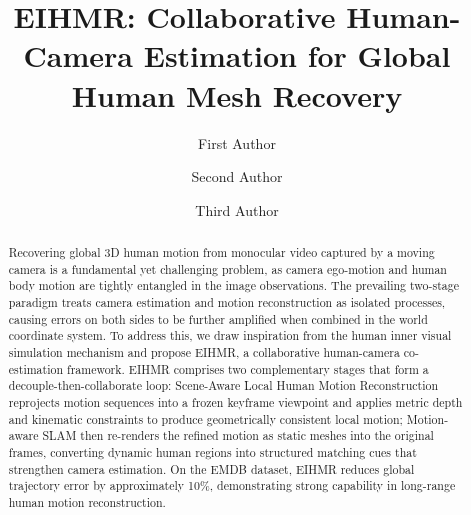 \documentclass[runningheads]{llncs}
\begin{document}
\title{EIHMR: Collaborative Human-Camera Estimation for Global Human Mesh Recovery}


\author{First Author \and
Second Author \and
Third Author}



\maketitle


\begin{abstract}
Recovering global 3D human motion from monocular video captured by a moving camera is a fundamental yet challenging problem, as camera ego-motion and human body motion are tightly entangled in the image observations. The prevailing two-stage paradigm treats camera estimation and motion reconstruction as isolated processes, causing errors on both sides to be further amplified when combined in the world coordinate system. To address this, we draw inspiration from the human inner visual simulation mechanism and propose EIHMR, a collaborative human-camera co-estimation framework. EIHMR comprises two complementary stages that form a decouple-then-collaborate loop: Scene-Aware Local Human Motion Reconstruction reprojects motion sequences into a frozen keyframe viewpoint and applies metric depth and kinematic constraints to produce geometrically consistent local motion; Motion-aware SLAM then re-renders the refined motion as static meshes into the original frames, converting dynamic human regions into structured matching cues that strengthen camera estimation. On the EMDB dataset, EIHMR reduces global trajectory error by approximately 10\%, demonstrating strong capability in long-range human motion reconstruction.
\end{abstract}


\end{document}
